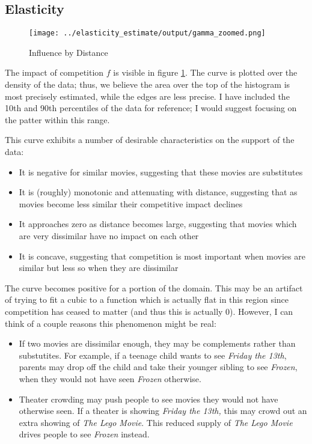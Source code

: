 \documentclass{article}
\begin{document}
\subsection{Elasticity}

\begin{center}
    \begin{figure}
        \texttt{[image: ../elasticity\_estimate/output/gamma\_zoomed.png]}
        \caption{Influence by Distance}
        \label{fig:gamma_zoomed}
    \end{figure}
\end{center}

The impact of competition $f$ is visible in figure \ref{fig:gamma_zoomed}. The curve is plotted over the density of the data; thus, we believe the area over the top of the histogram is most precisely estimated, while the edges are less precise. I have included the 10th and 90th percentiles of the data for reference; I would suggest focusing on the patter within this range.

This curve exhibits a number of desirable characteristics on the support of the data:
\begin{itemize}
    \item It is negative for similar movies, suggesting that these movies are substitutes
    \item It is (roughly) monotonic and attenuating with distance, suggesting that as movies become less similar their competitive impact declines
    \item It approaches zero as distance becomes large, suggesting that movies which are very dissimilar have no impact on each other
    \item It is concave, suggesting that competition is most important when movies are similar but less so when they are dissimilar
\end{itemize}

The curve becomes positive for a portion of the domain. This may be an artifact of trying to fit a cubic to a function which is actually flat in this region since competition has ceased to matter (and thus this is actually 0). However, I can think of a couple reasons this phenomenon might be real:
\begin{itemize}
    \item If two movies are dissimilar enough, they may be complements rather than substutites. For example, if a teenage child wants to see \emph{Friday the 13th}, parents may drop off the child and take their younger sibling to see \emph{Frozen}, when they would not have seen \emph{Frozen} otherwise.
    \item Theater crowding may push people to see movies they would not have otherwise seen. If a theater is showing \emph{Friday the 13th,} this may crowd out an extra showing of \emph{The Lego Movie}. This reduced supply of \emph{The Lego Movie} drives people to see \emph{Frozen} instead.
\end{itemize}
\end{document}
